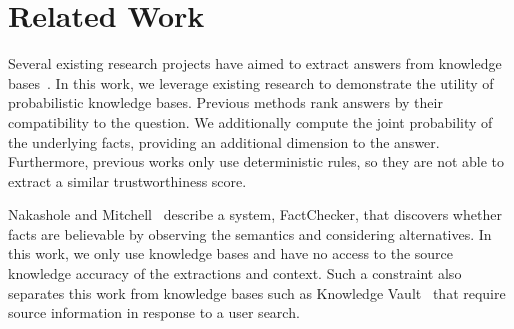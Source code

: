 

\section{Related Work}

Several existing research projects have aimed to extract answers from knowledge bases~\cite{yahya2012natural,yao2014information}.
In this work, we leverage existing research to demonstrate the utility of probabilistic knowledge bases.
Previous methods rank answers by their compatibility to the question.
We additionally compute the joint probability of the underlying facts, providing an additional dimension to the answer.
Furthermore, previous works only use deterministic rules, so they are not able to extract a similar trustworthiness score.

Nakashole and Mitchell~\cite{nakashole2014languageaware} describe a system,
FactChecker, that discovers whether facts are believable by observing the
semantics and considering alternatives. 
In this work, we only use knowledge bases and have no access to the source
knowledge accuracy of the extractions and context.
Such a constraint also separates this work from knowledge bases such as
Knowledge Vault~\cite{dong2014knowledge} that require source information in
response to a user search.

